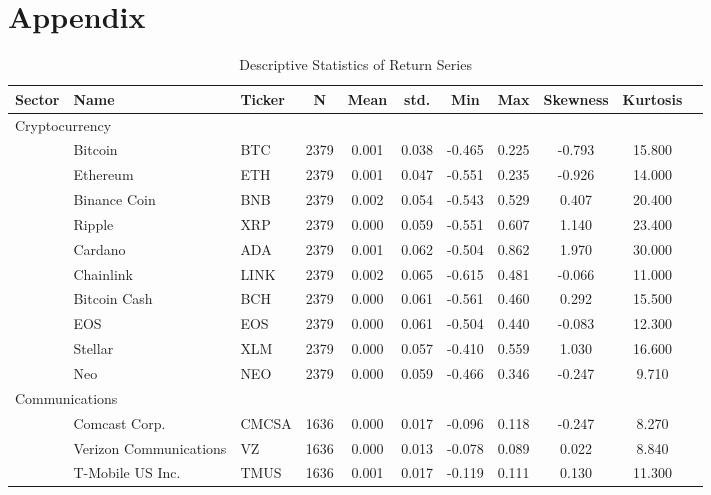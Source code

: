 \documentclass{article}
\begin{document}



\section*{Appendix}\label{app}
\vspace{-8mm}
\begin{table}[H]\centering
\scriptsize
\caption{Descriptive Statistics of Return Series}\label{tab:sum}
\begin{threeparttable}
\begin{tabular}{p{1.75cm}p{3.5cm}lcccccccc}
\toprule
Sector & Name & Ticker & N & Mean & std. & Min & Max & Skewness & Kurtosis \\
\midrule 
\multicolumn{2}{l}{Cryptocurrency}\\[1mm]
& Bitcoin            & BTC & 2379 & 0.001 & 0.038 & -0.465 & 0.225 & -0.793 & 15.800 \\
& Ethereum           & ETH & 2379 & 0.001 & 0.047 & -0.551 & 0.235 & -0.926 & 14.000 \\
& Binance Coin       & BNB & 2379 & 0.002 & 0.054 & -0.543 & 0.529 & 0.407  & 20.400 \\
& Ripple             & XRP & 2379 & 0.000 & 0.059 & -0.551 & 0.607 & 1.140  & 23.400 \\
& Cardano            & ADA & 2379 & 0.001 & 0.062 & -0.504 & 0.862 & 1.970  & 30.000 \\
& Chainlink          & LINK& 2379 & 0.002 & 0.065 & -0.615 & 0.481 & -0.066 & 11.000 \\
& Bitcoin Cash       & BCH & 2379 & 0.000 & 0.061 & -0.561 & 0.460 & 0.292  & 15.500 \\
& EOS                & EOS & 2379 & 0.000 & 0.061 & -0.504 & 0.440 & -0.083 & 12.300 \\
& Stellar            & XLM & 2379 & 0.000 & 0.057 & -0.410 & 0.559 & 1.030  & 16.600 \\
& Neo                & NEO & 2379 & 0.000 & 0.059 & -0.466 & 0.346 & -0.247 & 9.710  \\
\multicolumn{2}{l}{Communications}\\[1mm]
& Comcast Corp.           & CMCSA  & 1636 & 0.000 & 0.017 & -0.096 & 0.118 & -0.247 & 8.270 \\
& Verizon Communications  & VZ     & 1636 & 0.000 & 0.013 & -0.078 & 0.089 & 0.022 & 8.840 \\
& T-Mobile US Inc.        & TMUS   & 1636 & 0.001 & 0.017 & -0.119 & 0.111 & 0.130 & 11.300 \\

\end{tabular}
\end{threeparttable}
\end{table}
\end{document}

